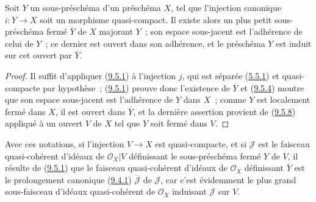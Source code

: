 \begin{proposition}[9.5.10]
\label{I.9.5.10-fr}
Soit $Y$ un sous-préschéma d'un préschéma $X$, tel que l'injection canonique
$i:Y\to X$ soit un morphisme quasi-compact. Il existe alors un plus petit
sous-préschéma fermé $\overline{Y}$ de $X$ majorant $Y$~; son espace
sous-jacent est l'adhérence de celui de $Y$~; ce dernier est ouvert dans son
adhérence, et le préschéma $Y$ est induit sur cet ouvert par $\overline{Y}$.
\end{proposition}

\begin{proof}
Il suffit d'appliquer (\hyperref[I.9.5.1-fr]{9.5.1}) à l'injection $j$, qui
est séparée (\hyperref[I.5.5.1-fr]{5.5.1}) et quasi-compacte par hypothèse~;
(\hyperref[I.9.5.1-fr]{9.5.1}) prouve donc l'existence de $\overline{Y}$ et
(\hyperref[I.9.5.4-fr]{9.5.4}) montre que son espace sous-jacent est
l'adhérence de $Y$ dans $X$~; comme $Y$ est localement fermé dans $X$, il
est ouvert dans $\overline{Y}$, et la dernière assertion provient de
(\hyperref[I.9.5.8-fr]{9.5.8}) appliqué à un ouvert $V$ de $X$ tel que $Y$
soit fermé dans $V$.
\end{proof}

Avec ces notations, si l'injection $V\to X$ est quasi-compacte, et si
$\mathscr{J}$ est le faisceau quasi-cohérent d'idéaux de
$\mathscr{O}_X|V$ définissant le sous-préschéma fermé $Y$ de $V$, il résulte
de (\hyperref[I.9.5.1-fr]{9.5.1}) que le faisceau quasi-cohérent d'idéaux de
$\mathscr{O}_X$ définissant $\overline{Y}$ est le prolongement canonique
(\hyperref[I.9.4.1-fr]{9.4.1}) $\overline{\mathscr{J}}$ de $\mathscr{J}$,
car c'est évidemment le plus grand sous-faisceau d'idéaux quasi-cohérent de
$\mathscr{O}_X$ induisant $\mathscr{J}$ sur $V$.
